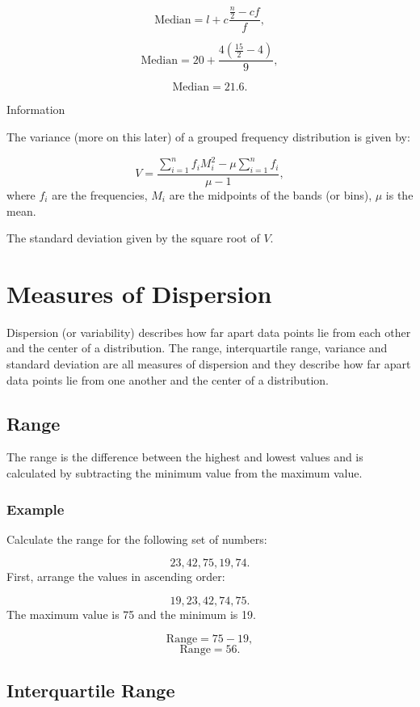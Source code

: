 \documentclass[
]{book}
\begin{document}
\[\textrm{Median} = l + c \frac{\frac{n}{2}-cf}{f},\]

\[\textrm{Median} = 20 + \frac{4(\frac{15}{2}-4)}{9}, \]

\[\textrm{Median} =21.6.\]

Information

The variance (more on this later) of a grouped frequency distribution is given by:

\[ V=\frac{\sum_{i=1}^n f_i M_i^2 - \mu \sum_{i=1}^n f_i}{\mu -1},
 \]
where \(f_i\) are the frequencies, \(M_i\) are the midpoints of the bands (or bins), \(\mu\) is the mean.

The standard deviation given by the square root of \(V\).

\hypertarget{measures-of-dispersion}{%
\section{Measures of Dispersion}\label{measures-of-dispersion}}

Dispersion (or variability) describes how far apart data points lie from each other and the center of a distribution. The range, interquartile range, variance and standard deviation are all measures of dispersion and they describe how far apart data points lie from one another and the center of a distribution.

\hypertarget{range}{%
\subsection{Range}\label{range}}

The range is the difference between the highest and lowest values and is calculated by subtracting the minimum value from the maximum value.

\hypertarget{example-7}{%
\subsubsection{Example}\label{example-7}}

Calculate the range for the following set of numbers:

\[ 23, 42, 75, 19, 74. \]
First, arrange the values in ascending order:

\[ 19, 23, 42, 74, 75. \]
The maximum value is 75 and the minimum is 19.

\[ \textrm{Range}= 75 - 19, \]
\[ \textrm{Range} = 56.\]

\hypertarget{iqr}{%
\subsection{Interquartile Range}\label{iqr}}
\end{document}

